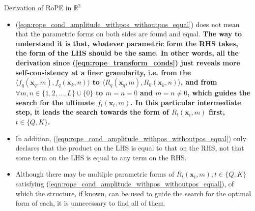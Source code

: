 \documentclass{beamer}
\begin{document}
	\begin{frame}{Derivation of RoPE in $\mathbb{R}^2$}
		\begin{itemize}			
			\item (\ref{eqn:rope_cond_amplitude_withpos_withoutpos_equal}) does not mean that the parametric forms on both sides are found and equal. \textbf{The way to understand it is that, whatever parametric form the RHS takes, the form of the LHS should be the same. In other words, all the derivation since (\ref{eqn:rope_transform_conds}) just reveals more self-consistency at a finer granularity, i.e. from the $\langle f_q(\mathbf{x}_q, m), f_q(\mathbf{x}_k, n)\rangle$ to $\langle R_q(\mathbf{x}_q, m), R_k(\mathbf{x}_k, n)\rangle$, and from $\forall m,n\in\{1,2,...,L\} \cup \{0\}$ to $m=n=0$ and $m=n\ne 0$, which guides the search for the ultimate $f_t(\mathbf{x}_t, m)$. In this particular intermediate step, it leads the search towards the form of $R_t(\mathbf{x}_t, m)$ first, $t\in\{Q,K\}$.}
			\item In addition, (\ref{eqn:rope_cond_amplitude_withpos_withoutpos_equal}) only declares that the product on the LHS is equal to that on the RHS, not that some term on the LHS is equal to any term on the RHS.
			\item Although there may be multiple parametric forms of $R_t(\mathbf{x}_t, m), t\in\{Q,K\}$ satisfying (\ref{eqn:rope_cond_amplitude_withpos_withoutpos_equal}), of which the structure, if known, can be used to guide the search for the optimal form of each, it is unnecessary to find all of them.			
		\end{itemize}		
	\end{frame}
	
	
	
\end{document}
